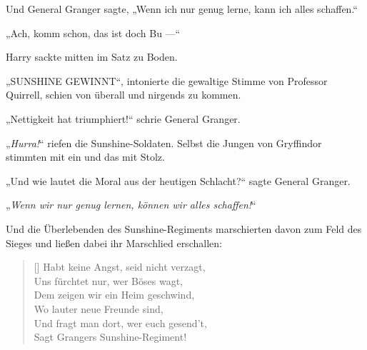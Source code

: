 Und General Granger sagte,
„Wenn ich nur genug lerne, kann ich alles schaffen.“

„Ach, komm schon, das ist doch Bu —“


Harry sackte mitten im Satz zu Boden.

„SUNSHINE GEWINNT“, intonierte die gewaltige Stimme von Professor Quirrell, schien von überall und nirgends zu kommen.

„Nettigkeit hat triumphiert!“ schrie General Granger.

„\emph{Hurra!}“ riefen die Sunshine-Soldaten. Selbst die Jungen von Gryffindor stimmten mit ein und das mit Stolz.

„Und wie lautet die Moral aus der heutigen Schlacht?“ sagte General Granger.

„\emph{Wenn wir nur genug lernen, können wir alles schaffen!}“

Und die Überlebenden des Sunshine-Regiments marschierten davon zum Feld des Sieges und ließen dabei ihr Marschlied erschallen:

\baselineskip\settowidth{\versewidth}{Und fragt man dort, wer euch gesend’t,}
\begin{verse}[\versewidth]
Habt keine Angst, seid nicht verzagt,\\
Uns fürchtet nur, wer Böses wagt,\\
Dem zeigen wir ein Heim geschwind,\\
Wo lauter neue Freunde sind,\\
Und fragt man dort, wer euch gesend’t,\\
Sagt Grangers Sunshine-Regiment!
\end{verse}

